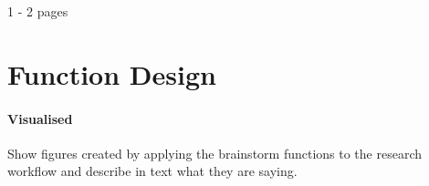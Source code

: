 1 - 2 pages

\section{Function Design}

\paragraph{Visualised}
Show figures created by applying the brainstorm functions to the research workflow and describe in text what they are saying.